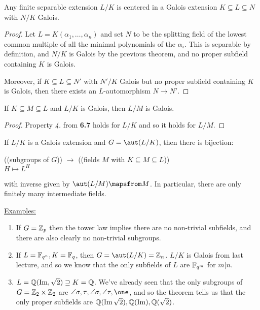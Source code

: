 \documentclass[a4paper, 10pt, twocolumn]{amsart}
\begin{document}
\begin{corollary}
Any finite separable extension $L/K$ is centered in a Galois extension $K \subseteq L \subseteq N$ with $N/K$ Galois.
\end{corollary}
\begin{proof}
Let $L = K(\alpha_1, \ldots, \alpha_n)$ and set $N$ to be the splitting field of the lowest common multiple of all the minimal polynomials of the $\alpha_i$. This is separable by definition, and $N/K$ is Galois by the previous theorem, and no proper subfield containing $K$ is Galois.

Moreover, if $K \subseteq L \subseteq N'$ with $N'/K$ Galois but no proper subfield containing $K$ is Galois, then there exists an $L$-automorphism $N \to N'$.
\end{proof}
\begin{corollary}
If $K \subseteq M \subseteq L$ and $L/K$ is Galois, then $L/M$ is Galois.
\end{corollary}
\begin{proof}
Property \textit{4.} from \textbf{6.7} holds for $L/K$ and so it holds for $L/M$.
\end{proof}
\begin{theorem}
If $L/K$ is a Galois extension and $G = \aut(L/K)$, then there is bijection:
\begin{center}
((subgroups of $G$)) $\to$ ((fields $M$ with $K \subseteq M \subseteq L$))\\
$H \mapsto L^H$
\end{center}
with inverse given by $\aut(L/M)\mapsfrom M$. In particular, there are only finitely many intermediate fields.
\end{theorem}
\underline{Examples:}
\begin{enumerate}
\item If $G = \mathbb{Z}_p$ then the tower law implies there are no non-trivial subfields, and there are also clearly no non-trivial subgroups.
\item If $L = \mathbb{F}_{q^n}, K = \mathbb{F}_q$, then $G = \aut(L/K) = \Z_n$. $L/K$ is Galois from last lecture, and so we know that the only subfields of $L$ are $\mathbb{F}_{q^m}$ for $m|n$.
\item $L = \mathbb{Q}(\operatorname{Im}, \sqrt{2}) \supseteq K = \mathbb{Q}$. We've already seen that the only subgroups of $G = \mathbb{Z}_2 \times \mathbb{Z}_2$ are $\angle{\sigma, \tau}, \angle{\sigma}, \angle{\tau}, \one$, and so the theorem tells us that the only proper subfields are $\mathbb{Q}(\operatorname{Im}\sqrt{2}), \mathbb{Q}(\operatorname{Im}), \mathbb{Q}(\sqrt{2})$.
\end{enumerate}
\end{document}
